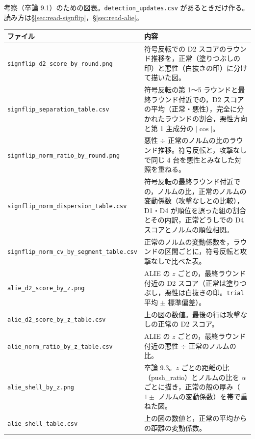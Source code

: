 \documentclass[a4j, dvipdfmx]{jsarticle}  %
\begin{document}
\noindent
考察（卒論 9.1）のための図表。\texttt{detection\_updates.csv} があるときだけ作る。読み方は\S\ref{sec:read-signflip}，\S\ref{sec:read-alie}。
\begin{table}[H]
\centering
\begin{tabular}{@{}P{5.6cm} P{9.7cm}@{}}
\toprule
ファイル & 内容 \\
\midrule
\texttt{signflip\_d2\_score\_}\allowbreak\texttt{by\_round.png} & 符号反転での D2 スコアのラウンド推移を，正常（塗りつぶしの印）と悪性（白抜きの印）に分けて描いた図。 \\
\texttt{signflip\_separation\_}\allowbreak\texttt{table.csv} & 符号反転の第 1〜5 ラウンドと最終ラウンド付近での，D2 スコアの平均（正常・悪性），完全に分かれたラウンドの割合，悪性方向と第 1 主成分の $|\cos|$。 \\
\texttt{signflip\_norm\_ratio\_}\allowbreak\texttt{by\_round.png} & 悪性 $\div$ 正常のノルムの比のラウンド推移。符号反転と，攻撃なしで同じ 4 台を悪性とみなした対照を重ねる。 \\
\texttt{signflip\_norm\_}\allowbreak\texttt{dispersion\_table.csv} & 符号反転の最終ラウンド付近での，ノルムの比，正常のノルムの変動係数（攻撃なしとの比較），D1・D4 が順位を誤った組の割合とその内訳，正常どうしでの D4 スコアとノルムの順位相関。 \\
\texttt{signflip\_norm\_cv\_}\allowbreak\texttt{by\_segment\_table.csv} & 正常のノルムの変動係数を，ラウンドの区間ごとに，符号反転と攻撃なしで比べた表。 \\
\texttt{alie\_d2\_score\_}\allowbreak\texttt{by\_z.png} & ALIE の $z$ ごとの，最終ラウンド付近の D2 スコア（正常は塗りつぶし，悪性は白抜きの印。\texttt{trial} 平均 $\pm$ 標準偏差）。 \\
\texttt{alie\_d2\_score\_}\allowbreak\texttt{by\_z\_table.csv} & 上の図の数値。最後の行は攻撃なしの正常の D2 スコア。 \\
\texttt{alie\_norm\_ratio\_}\allowbreak\texttt{by\_z\_table.csv} & ALIE の $z$ ごとの，最終ラウンド付近の悪性 $\div$ 正常のノルムの比。 \\
\texttt{alie\_shell\_by\_z.png} & 卒論 9.3。$z$ ごとの距離の比（push\_ratio）とノルムの比を $\alpha$ ごとに描き，正常の殻の厚み（$1 \pm$ ノルムの変動係数）を帯で重ねた図。 \\
\texttt{alie\_shell\_table.csv} & 上の図の数値と，正常の平均からの距離の変動係数。 \\
\bottomrule
\end{tabular}
\end{table}
\end{document}
